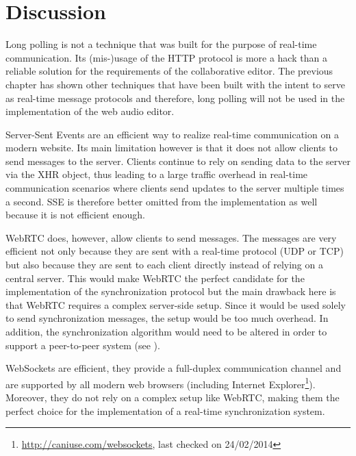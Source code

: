 \section{Discussion}
\label{sec:realtime-discussion}

Long polling is not a technique that was built for the purpose of real-time communication. Its (mis-)usage of the HTTP protocol is more a hack than a reliable solution for the requirements of the collaborative editor. The previous chapter has shown other techniques that have been built with the intent to serve as real-time message protocols and therefore, long polling will not be used in the implementation of the web audio editor.

Server-Sent Events are an efficient way to realize real-time communication on a modern website. Its main limitation however is that it does not allow clients to send messages to the server. Clients continue to rely on sending data to the server via the XHR object, thus leading to a large traffic overhead in real-time communication scenarios where clients send updates to the server multiple times a second. SSE is therefore better omitted from the implementation as well because it is not efficient enough.

WebRTC does, however, allow clients to send messages. The messages are very efficient not only because they are sent with a real-time protocol (UDP or TCP) but also because they are sent to each client directly instead of relying on a central server. This would make WebRTC the perfect candidate for the implementation of the synchronization protocol but the main drawback here is that WebRTC requires a complex server-side setup. Since it would be used solely to send synchronization messages, the setup would be too much overhead. In addition, the synchronization algorithm would need to be altered in order to support a peer-to-peer system (see ).

WebSockets are efficient, they provide a full-duplex communication channel and are supported by all modern web browsers (including Internet Explorer\footnote{\url{http://caniuse.com/websockets}, last checked on 24/02/2014}). Moreover, they do not rely on a complex setup like WebRTC, making them the perfect choice for the implementation of a real-time synchronization system.